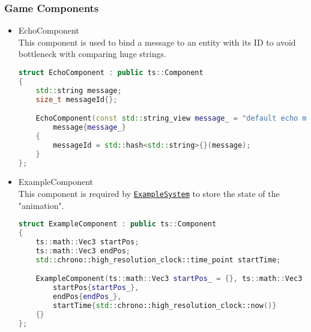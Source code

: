 \subsubsection{Game Components}
\label{sec:game_components}
\begin{itemize}
    \item EchoComponent\\
    \label{echo_component}
    This component is used to bind a message to an entity with its ID to avoid bottleneck with comparing huge strings.
\begin{lstlisting}[language=c++, caption=Echo component (./game/components/echo\_component.hpp)]
struct EchoComponent : public ts::Component
{
    std::string message;
    size_t messageId{};

    EchoComponent(const std::string_view message_ = "default echo message") :
        message{message_}
    {
        messageId = std::hash<std::string>{}(message);
    }
};
\end{lstlisting}
    \item ExampleComponent\\
    \label{example_component}
    This component is required by \hyperref[example_system]{\texttt{ExampleSystem}} to store the state of the "animation".
\begin{lstlisting}[language=c++, caption=Example component (./game/components/example\_component.hpp)]
struct ExampleComponent : public ts::Component
{
    ts::math::Vec3 startPos;
    ts::math::Vec3 endPos;
    std::chrono::high_resolution_clock::time_point startTime;

    ExampleComponent(ts::math::Vec3 startPos_ = {}, ts::math::Vec3 endPos_ = {}) :
        startPos{startPos_},
        endPos{endPos_},
        startTime{std::chrono::high_resolution_clock::now()}
    {}
};
\end{lstlisting}
\end{itemize}

